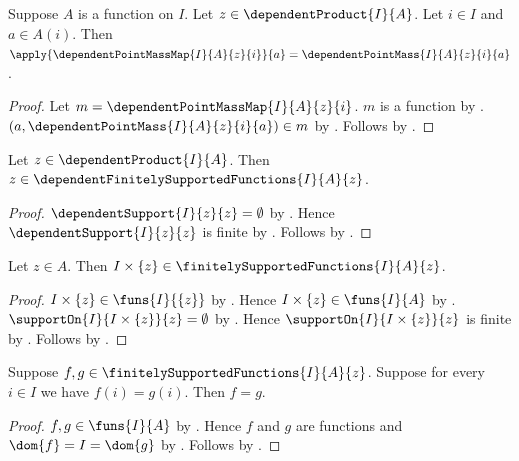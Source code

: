 \begin{proposition}\label{dependent_point_mass_map_apply}
    Suppose $A$ is a function on $I$.
    Let $z\in\dependentProduct{I}{A}$.
    Let $i\in I$ and $a\in A(i)$.
    Then
        $\apply{\dependentPointMassMap{I}{A}{z}{i}}{a}
            =\dependentPointMass{I}{A}{z}{i}{a}$.
\end{proposition}
\begin{proof}
    Let $m=\dependentPointMassMap{I}{A}{z}{i}$.
    $m$ is a function by
        .
    $(a,\dependentPointMass{I}{A}{z}{i}{a})\in m$ by
        .
    Follows by .
\end{proof}

\begin{proposition}\label{zero_section_is_finitely_supported}
    Let $z\in\dependentProduct{I}{A}$.
    Then
        $z\in\dependentFinitelySupportedFunctions{I}{A}{z}$.
\end{proposition}
\begin{proof}
    $\dependentSupport{I}{z}{z}=\emptyset$ by
        .
    Hence $\dependentSupport{I}{z}{z}$ is finite by
        .
    Follows by .
\end{proof}

\begin{proposition}\label{constant_zero_function_is_finitely_supported}
    Let $z\in A$.
    Then
        $I\times\{z\}\in\finitelySupportedFunctions{I}{A}{z}$.
\end{proposition}
\begin{proof}
    $I\times\{z\}\in\funs{I}{\{z\}}$ by
        .
    Hence $I\times\{z\}\in\funs{I}{A}$ by
        .
    $\supportOn{I}{I\times\{z\}}{z}=\emptyset$ by
        .
    Hence $\supportOn{I}{I\times\{z\}}{z}$ is finite by
        .
    Follows by .
\end{proof}

\begin{proposition}\label{finitely_supported_function_extensionality}
    Suppose $f,g\in\finitelySupportedFunctions{I}{A}{z}$.
    Suppose for every $i\in I$ we have $f(i)=g(i)$.
    Then $f=g$.
\end{proposition}
\begin{proof}
    $f,g\in\funs{I}{A}$ by
        .
    Hence $f$ and $g$ are functions and $\dom{f}=I=\dom{g}$ by
        .
    Follows by .
\end{proof}

